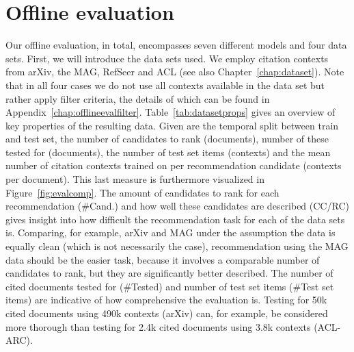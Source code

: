 \section{Offline evaluation}\label{sec:offeval}
Our offline evaluation, in total, encompasses seven different models and four data sets. First, we will introduce the data sets used. We  employ citation contexts from arXiv, the MAG, RefSeer and ACL (see also Chapter~\ref{chap:dataset}).
Note that in all four cases we do not use all contexts available in the data set but rather apply filter criteria, the details of which can be found in Appendix~\ref{chap:offlineevalfilter}.
Table~\ref{tab:datasetprops} gives an overview of key properties of the resulting data. Given are the temporal split between train and test set, the number of candidates to rank (documents), number of these tested for (documents), the number of test set items (contexts) and the mean number of citation contexts trained on per recommendation candidate (contexts per document). This last measure is furthermore visualized in Figure~\ref{fig:evalcomp}. The amount of candidates to rank for each recommendation (\#Cand.) and how well these candidates are described (CC/RC) gives insight into how difficult the recommendation task for each of the data sets is. Comparing, for example, arXiv and MAG under the assumption the data is equally clean (which is not necessarily the case), recommendation using the MAG data should be the easier task, because it involves a comparable number of candidates to rank, but they are significantly better described. The number of cited documents tested for (\#Tested) and number of test set items (\#Test set items) are indicative of how comprehensive the evaluation is. Testing for 50k cited documents using 490k contexts (arXiv) can, for example, be considered more thorough than testing for 2.4k cited documents using 3.8k contexts (ACL-ARC).


